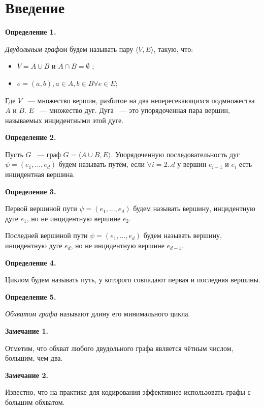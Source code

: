 \documentclass[14pt]{mmcs-article}
\begin{document}
\section*{Введение}

\textbf{Определение 1.}


\textsl{Двудольным графом} будем называть пару $\langle V,E \rangle$, такую, что:

\begin{itemize}
    \item $V = A \cup B$ и $A \cap B = \emptyset$ ;
    \item $e = (a, b), a \in A, b \in B \forall e \in E$;
\end{itemize}

Где $V$ ~--- множество вершин, разбитое на два непересекающихся подмножества $A$ и $B$.
$E$ ~--- множество дуг. Дуга ~--- это упорядоченная пара вершин, называемых инцидентными этой дуге.

\textbf{Определение 2.}

Пусть $G$ ~--- граф $G = \langle A \cup B, E \rangle$.
Упорядоченную последовательность дуг $\psi = (e_1, ..., e_d)$ будем называть путём, если $\forall i = 2..d$ у вершин $e_{i-1}$ и $e_i$ есть инцидентная вершина.

\textbf{Определение 3.}

Первой вершиной пути $\psi = (e_1, ..., e_d)$ будем называть вершину, инцидентную дуге $e_1$, но не инцидентную вершине $e_2$.

Последней вершиной пути $\psi = (e_1, ..., e_d)$ будем называть вершину, инцидентную дуге $e_d$, но не инцидентную вершине $e_{d-1}$.

\textbf{Определение 4.}

Циклом будем называть путь, у которого совпадают первая и последняя вершины.

\textbf{Определение 5.}

\textsl{Обхватом графа} называют длину его минимального цикла.

\textbf{Замечание 1.}

Отметим, что обхват любого двудольного графа является чётным числом, большим, чем два.

\textbf{Замечание 2.}

Известно, что на практике для кодирования эффективнее использовать графы с большим обхватом.
\end{document}
